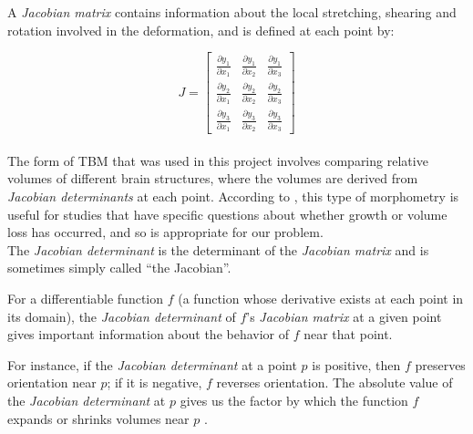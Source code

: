 A \textit{Jacobian matrix} contains information about the local
stretching, shearing and rotation involved in the deformation, and is
defined at each point by:

\[
J = \begin{bmatrix}
  \frac{\partial y_1}{\partial x_1} & \frac{\partial y_1}{\partial x_2} & \frac{\partial y_1}{\partial x_3} \\[0.3em]
  \frac{\partial y_2}{\partial x_1} & \frac{\partial y_2}{\partial x_2} & \frac{\partial y_2}{\partial x_3} \\[0.3em]
  \frac{\partial y_3}{\partial x_1} & \frac{\partial y_3}{\partial x_2} & \frac{\partial y_3}{\partial x_3}
\end{bmatrix}
\]\\

The form of TBM that was used in this project involves comparing
relative volumes of different brain structures, where the volumes are
derived from \textit{Jacobian determinants} at each point. According
to \cite{ashburner}, this type of morphometry is useful for studies
that have specific questions about whether growth or volume loss has
occurred, and so is appropriate for our problem.\\

The \textit{Jacobian determinant} is the determinant of the
\textit{Jacobian matrix} and is sometimes simply called ``the
Jacobian''.

For a differentiable function $f$ (a function whose derivative exists
at each point in its domain), the \textit{Jacobian determinant} of
$f$'s \textit{Jacobian matrix} at a given point gives important
information about the behavior of $f$ near that point.

For instance, if the \textit{Jacobian determinant} at a point $p$ is
positive, then $f$ preserves orientation near $p$; if it is negative,
$f$ reverses orientation. The absolute value of the \textit{Jacobian
  determinant} at $p$ gives us the factor by which the function $f$
expands or shrinks volumes near $p$ \cite{jacobian}.




